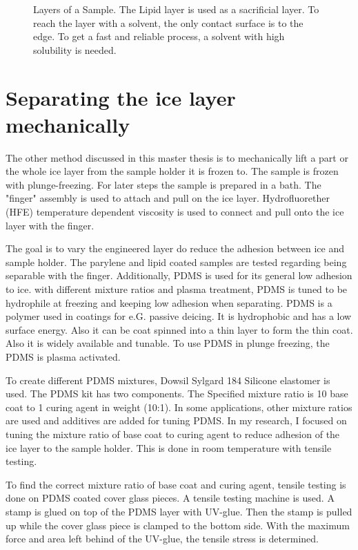 \begin{figure}[hbt!]
	\centering
	
	\caption{Layers of a Sample. The Lipid layer is used as a sacrificial layer. To reach the layer with a solvent, the only contact surface is to the edge. To get a fast and reliable process, a solvent with high solubility is needed.}
	\label{fig:sacrificial layer}
\end{figure}

\section{Separating the ice layer mechanically}

The other method discussed in this master thesis is to mechanically lift a part or the whole ice layer from the sample holder it is frozen to. The sample is frozen with plunge-freezing. For later steps the sample is prepared in a bath. The "finger" assembly is used to attach and pull on the ice layer. Hydrofluorether (HFE) temperature dependent viscosity is used to connect and pull onto the ice layer with the finger.

The goal is to vary the engineered layer do reduce the adhesion between ice and sample holder. The parylene and lipid coated samples are tested regarding being separable with the finger. Additionally, PDMS is used for its general low adhesion to ice. with different mixture ratios and plasma treatment, PDMS is tuned to be hydrophile at freezing and keeping low adhesion when separating.
PDMS is a polymer used in coatings for e.G. passive deicing. It is hydrophobic and has a low surface energy. Also it can be coat spinned into a thin layer to form the thin coat. Also it is widely available and tunable. To use PDMS in plunge freezing, the PDMS is plasma activated.

To create different PDMS mixtures, Dowsil Sylgard 184 Silicone elastomer is used\cite{DOW.}. The PDMS kit has two components. The Specified mixture ratio is 10 base coat to 1 curing agent in weight (10:1). In some applications, other mixture ratios are used and additives are added for tuning PDMS. In my research, I focused on tuning the mixture ratio of base coat to curing agent to reduce adhesion of the ice layer to the sample holder.  This is done in room temperature with tensile testing.

To find the correct mixture ratio of base coat and curing agent, tensile testing is done on PDMS coated cover glass pieces. A tensile testing machine is used. A stamp is glued on top of the PDMS layer with UV-glue. Then the stamp is pulled up while the cover glass piece is clamped to the bottom side. With the maximum force and area left behind of the UV-glue, the tensile stress is determined.

